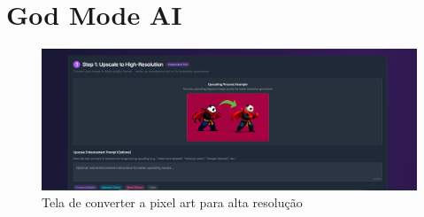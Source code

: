 \FloatBarrier
\section{God Mode AI}
\label{s.godmodeAIApendice}

\begin{figure}[htbp]
    \centering
    \caption{\small Tela de converter a pixel art para alta resolução}
    \label{fig:godmodAIpixelto3D}
    \includegraphics[width=1\linewidth]{figs/godmodAI/tela pixel art para 3D.PNG}
\end{figure}

